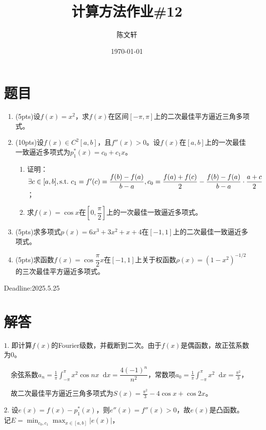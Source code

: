 \documentclass[cn,hazy,green,11pt,normal]{elegantnote}
\title{计算方法作业\#12}
\author{陈文轩}
\institute{KFRC}
\date{\today}
\newcommand*{\diff}{\mathop{}\!\mathrm{d}}
\begin{document}
\maketitle

\section{题目}


\begin{enumerate}

    \item (5pts)设$f(x)=x^2$，求$f(x)$在区间$[-\pi,\pi]$上的二次最佳平方逼近三角多项式。

    \item (10pts)设$f(x)\in C^2[a,b]$，且$f''(x)>0$。设$f(x)$在$[a,b]$上的一次最佳一致逼近多项式为$p_1^*(x)=c_0+c_1 x$。
        \begin{enumerate}
            \item 证明：$\exists c\in[a,b],\text{s.t.\,\,} c_1=f'(c)=\dfrac{f(b)-f(a)}{b-a},c_0=\dfrac{f(a)+f(c)}{2}-\dfrac{f(b)-f(a)}{b-a}\cdot\dfrac{a+c}{2}$；
            \item 求$f(x)=\cos x$在$\left[0,\dfrac{\pi}{2}\right]$上的一次最佳一致逼近多项式。
        \end{enumerate}

    \item (5pts)求多项式$p(x)=6x^3+3x^2+x+4$在$[-1,1]$上的二次最佳一致逼近多项式。

    \item (5pts)求函数$f(x)=\cos \dfrac{\pi}{2}x$在$[-1,1]$上关于权函数$\rho(x)=(1-x^2)^{-1/2}$的三次最佳平方逼近多项式。
\end{enumerate}

    Deadline:2025.5.25

\section{解答}

    $1.\,\,$即计算$f(x)$的Fourier级数，并截断到二次。由于$f(x)$是偶函数，故正弦系数为0。

    $\quad$余弦系数$a_n=\frac1{\pi}\int_{-\pi}^{\pi}x^2\cos nx \diff x=\dfrac{4(-1)^n}{n^2}$，常数项$a_0=\frac1{\pi}\int_{-\pi}^{\pi}x^2\diff x=\frac{\pi^2}{3}$，

    $\quad$故二次最佳平方逼近三角多项式为$S(x)=\frac{\pi^2}3-4\cos x+\cos 2x$。

    $2.\,\,$设$e(x)=f(x)-p_1^*(x)$，则$e''(x)=f''(x)>0$，故$e(x)$是凸函数。记$E=\min_{c_0,c_1}\max_{x\in[a,b]}|e(x)|$，
\end{document}
